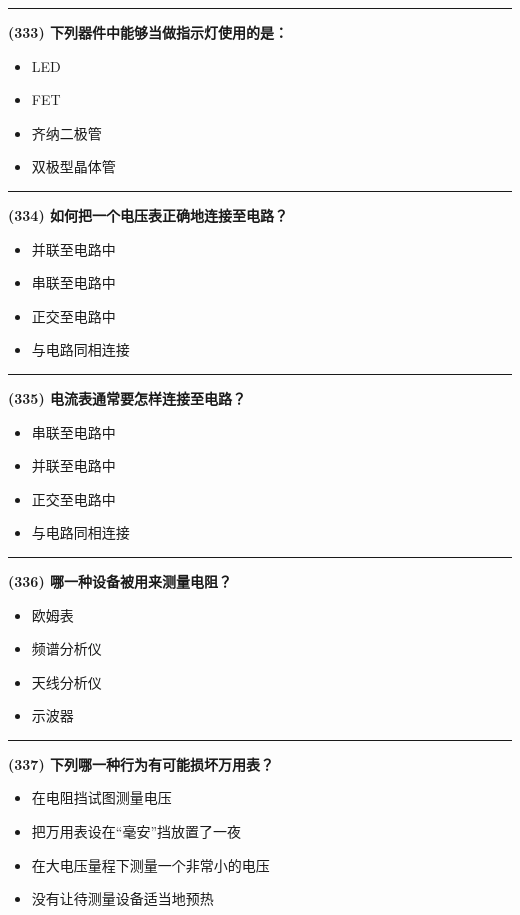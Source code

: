 \documentclass[twocolumn]{ctexart}  %
\begin{document}
\noindent\rule{0.5\textwidth}{1pt}
\heiti \textbf{(333) 下列器件中能够当做指示灯使用的是：} \songti {\color{gray} [LK1170] }
\begin{itemize}
	\item  LED
	\item  FET
	\item  齐纳二极管
	\item  双极型晶体管
\end{itemize}


\noindent\rule{0.5\textwidth}{1pt}
\heiti \textbf{(334) 如何把一个电压表正确地连接至电路？} \songti {\color{gray} [LK1192] }
\begin{itemize}
	\item  并联至电路中
	\item  串联至电路中
	\item  正交至电路中
	\item  与电路同相连接
\end{itemize}


\noindent\rule{0.5\textwidth}{1pt}
\heiti \textbf{(335) 电流表通常要怎样连接至电路？} \songti {\color{gray} [LK1193] }
\begin{itemize}
	\item  串联至电路中
	\item  并联至电路中
	\item  正交至电路中
	\item  与电路同相连接
\end{itemize}


\noindent\rule{0.5\textwidth}{1pt}
\heiti \textbf{(336) 哪一种设备被用来测量电阻？} \songti {\color{gray} [LK1194] }
\begin{itemize}
	\item  欧姆表
	\item  频谱分析仪
	\item  天线分析仪
	\item  示波器
\end{itemize}


\noindent\rule{0.5\textwidth}{1pt}
\heiti \textbf{(337) 下列哪一种行为有可能损坏万用表？} \songti {\color{gray} [LK1195] }
\begin{itemize}
	\item  在电阻挡试图测量电压
	\item  把万用表设在“毫安”挡放置了一夜
	\item  在大电压量程下测量一个非常小的电压
	\item  没有让待测量设备适当地预热
\end{itemize}
\end{document}
